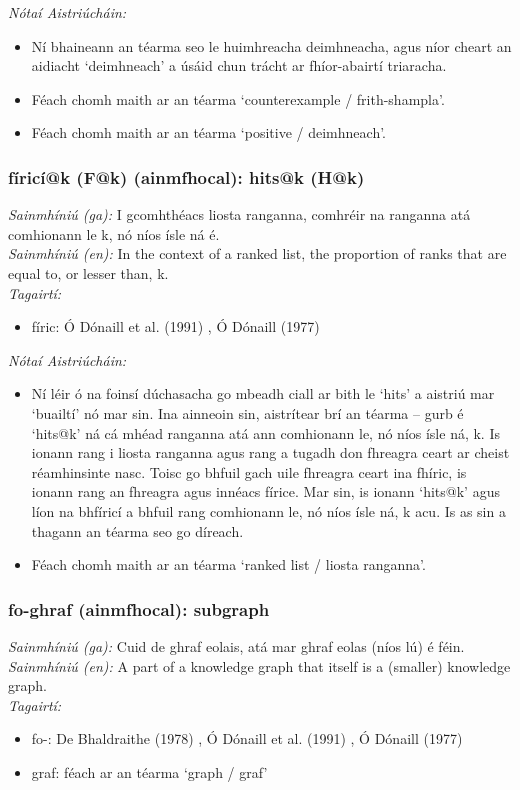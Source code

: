 \documentclass{article}
\begin{document}
 \noindent \textit{Nótaí Aistriúcháin:}
\begin{itemize}
	\item Ní bhaineann an téarma seo le huimhreacha deimhneacha, agus níor cheart an aidiacht `deimhneach' a úsáid chun trácht ar fhíor-abairtí triaracha.
	\item Féach chomh maith ar an téarma `counterexample / frith-shampla'.
	\item Féach chomh maith ar an téarma `positive / deimhneach'.
\end{itemize}


\subsubsection*{fíricí@k (F@k) (ainmfhocal): hits@k (H@k)}
 \noindent \textit{Sainmhíniú (ga):} I gcomhthéacs liosta ranganna, comhréir na ranganna atá comhionann le k, nó níos ísle ná é.
\\
 \noindent \textit{Sainmhíniú (en):} In the context of a ranked list, the proportion of ranks that are equal to, or lesser than, k.
\\
 \noindent \textit{Tagairtí:}
\begin{itemize}
	\item fíric: Ó Dónaill et al. (1991) \cite{focloir-beag}, Ó Dónaill (1977) \cite{odonaill}
\end{itemize}

 \noindent \textit{Nótaí Aistriúcháin:}
\begin{itemize}
	\item Ní léir ó na foinsí dúchasacha go mbeadh ciall ar bith le `hits' a aistriú mar `buailtí' nó mar sin. Ina ainneoin sin, aistrítear brí an téarma -- gurb é `hits@k' ná cá mhéad ranganna atá ann comhionann le, nó níos ísle ná, k. Is ionann rang i liosta ranganna agus rang a tugadh don fhreagra ceart ar cheist réamhinsinte nasc. Toisc go bhfuil gach uile fhreagra ceart ina fhíric, is ionann rang an fhreagra agus innéacs fírice. Mar sin, is ionann `hits@k' agus líon na bhfíricí a bhfuil rang comhionann le, nó níos ísle ná, k acu. Is as sin a thagann an téarma seo go díreach.
	\item Féach chomh maith ar an téarma `ranked list / liosta ranganna'.
\end{itemize}


\subsubsection*{fo-ghraf (ainmfhocal): subgraph}
 \noindent \textit{Sainmhíniú (ga):} Cuid de ghraf eolais, atá mar ghraf eolas (níos lú) é féin.
\\
 \noindent \textit{Sainmhíniú (en):} A part of a knowledge graph that itself is a (smaller) knowledge graph.
\\
 \noindent \textit{Tagairtí:}
\begin{itemize}
	\item fo-: De Bhaldraithe (1978) \cite{de-bhaldraithe}, Ó Dónaill et al. (1991) \cite{focloir-beag}, Ó Dónaill (1977) \cite{odonaill}
	\item graf: féach ar an téarma `graph / graf'
\end{itemize}
\end{document}
